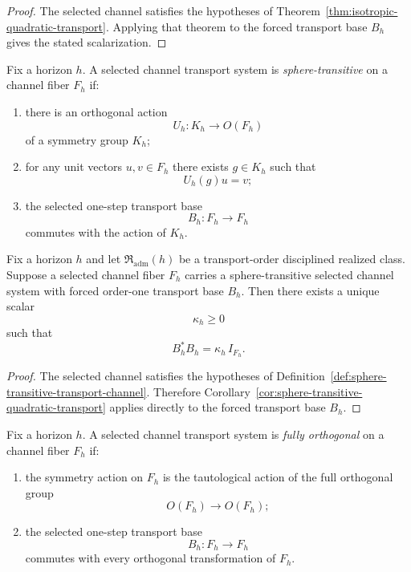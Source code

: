 \begin{proof}
The selected channel satisfies the hypotheses of
Theorem~\ref{thm:isotropic-quadratic-transport}. Applying that theorem to the
forced transport base $B_h$ gives the stated scalarization.
\end{proof}

\begin{definition}
\label{def:sphere-transitive-selected-channel-system}
Fix a horizon $h$. A selected channel transport system is
\emph{sphere-transitive} on a channel fiber $F_h$ if:
\begin{enumerate}[label=(\roman*), leftmargin=2em, itemsep=0.2em]
\item there is an orthogonal action
      \[
      U_h:K_h\to O(F_h)
      \]
      of a symmetry group $K_h$;
\item for any unit vectors $u,v\in F_h$ there exists $g\in K_h$ such that
      \[
      U_h(g)u=v;
      \]
\item the selected one-step transport base
      \[
      B_h:F_h\to F_h
      \]
      commutes with the action of $K_h$.
\end{enumerate}
\end{definition}

\begin{corollary}
\label{cor:realized-sphere-transitive-quadratic-transport}
Fix a horizon $h$ and let $\mathfrak R_{\mathrm{adm}}(h)$ be a transport-order
disciplined realized class. Suppose a selected channel fiber $F_h$ carries a
sphere-transitive selected channel system with forced order-one transport base
$B_h$. Then there exists a unique scalar
\[
\kappa_h\ge 0
\]
such that
\[
B_h^*B_h=\kappa_h\,I_{F_h}.
\]
\end{corollary}

\begin{proof}
The selected channel satisfies the hypotheses of
Definition~\ref{def:sphere-transitive-transport-channel}. Therefore
Corollary~\ref{cor:sphere-transitive-quadratic-transport} applies directly to
the forced transport base $B_h$.
\end{proof}

\begin{definition}
\label{def:full-orthogonal-selected-channel-system}
Fix a horizon $h$. A selected channel transport system is
\emph{fully orthogonal} on a channel fiber $F_h$ if:
\begin{enumerate}[label=(\roman*), leftmargin=2em, itemsep=0.2em]
\item the symmetry action on $F_h$ is the tautological action of the full
      orthogonal group
      \[
      O(F_h)\to O(F_h);
      \]
\item the selected one-step transport base
      \[
      B_h:F_h\to F_h
      \]
      commutes with every orthogonal transformation of $F_h$.
\end{enumerate}
\end{definition}

